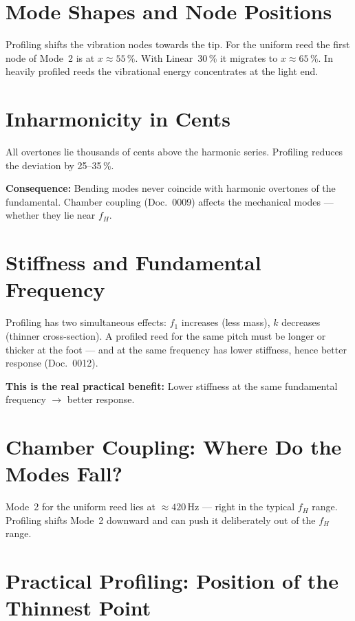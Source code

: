 \documentclass[11pt,a4paper]{article}
\begin{document}
\section{Mode Shapes and Node Positions}

Profiling shifts the vibration nodes towards the tip.
For the uniform reed the first node of Mode~2 is at $x \approx 55\,\%$.
With Linear~30\,\% it migrates to $x \approx 65\,\%$. In heavily profiled
reeds the vibrational energy concentrates at the light end.

\section{Inharmonicity in Cents}

All overtones lie thousands of cents above the harmonic series.
Profiling reduces the deviation by 25--35\,\%.

\begin{tcolorbox}[colframe=keygreen, colback=green!5!white]
\textbf{Consequence:} Bending modes never coincide with harmonic overtones
of the fundamental. Chamber coupling (Doc.~0009) affects the mechanical
modes --- whether they lie near $f_H$.
\end{tcolorbox}

\section{Stiffness and Fundamental Frequency}

Profiling has two simultaneous effects: $f_1$ increases (less mass),
$k$ decreases (thinner cross-section). A profiled reed for the same pitch
must be longer or thicker at the foot --- and at the same frequency has
lower stiffness, hence better response (Doc.~0012).

\textbf{This is the real practical benefit:} Lower stiffness at the same fundamental frequency
$\to$ better response.

\section{Chamber Coupling: Where Do the Modes Fall?}

Mode~2 for the uniform reed lies at $\approx 420$\,Hz --- right in the
typical $f_H$ range. Profiling shifts Mode~2 downward
and can push it deliberately out of the $f_H$ range.

\section{Practical Profiling: Position of the Thinnest Point}
\end{document}

